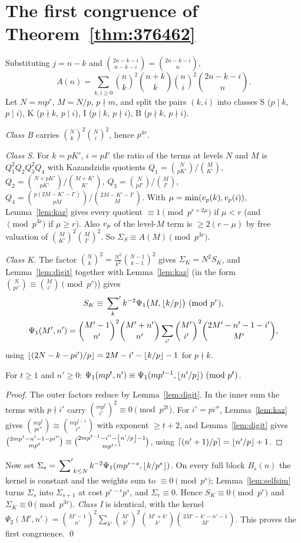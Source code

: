 \documentclass[11pt]{amsart}
\begin{document}
\section{The first congruence of Theorem~\ref{thm:376462}}\label{sec:first}

Substituting $j=n-k$ and $\binom{2n-k-i}{n-k-i}=\binom{2n-k-i}n$,
\[ A(n)=\sum_{k,i\ge0}\binom nk^2\binom{n+k}k\binom ni^2\binom{2n-k-i}{n}. \]
Let $N=mp^r$, $M=N/p$, $p\nmid m$, and split the pairs $(k,i)$ into classes S ($p\mid k$, $p\mid i$), K ($p\nmid k$, $p\mid i$), I ($p\mid k$, $p\nmid i$), B ($p\nmid k$, $p\nmid i$).

\emph{Class B} carries $\binom Nk^2\binom Ni^2$, hence $p^{4r}$.

\emph{Class S.} For $k=pK'$, $i=pI'$ the ratio of the terms at levels $N$ and $M$ is $Q_1^2Q_2Q_3^2Q_4$ with Kazandzidis quotients $Q_1=\binom N{pK'}/\binom M{K'}$, $Q_2=\binom{N+pK'}{pK'}/\binom{M+K'}{K'}$, $Q_3=\binom N{pI'}/\binom M{I'}$, $Q_4=\binom{p(2M-K'-I')}{pM}/\binom{2M-K'-I'}{M}$. With $\mu=\min(v_p(k),v_p(i))$, Lemma~\ref{lem:kaz} gives every quotient $\equiv1\pmod{p^{r+2\mu}}$ if $\mu<r$ (and $\pmod{p^{3r}}$ if $\mu\ge r$). Also $v_p$ of the level-$M$ term is $\ge2(r-\mu)$ by free valuation of $\binom M{K'}^2\binom M{I'}^2$. So $\Sigma_S\equiv A(M)\pmod{p^{3r}}$.

\emph{Class K.} The factor $\binom Nk^2=\frac{N^2}{k^2}\binom{N-1}{k-1}^2$ gives $\Sigma_K=N^2S_K$, and Lemma~\ref{lem:digit} together with Lemma~\ref{lem:kaz} (in the form $\binom{N}{pi'}\equiv\binom M{i'}\pmod{p^r}$) gives
\begin{gather*} S_K\equiv\sideset{}{'}\sum_kk^{-2}\Psi_1\bigl(M,\left\lfloor k/p\right\rfloor\bigr)\ (\mathrm{mod}\ p^r),\\ \Psi_1(M',n')=\binom{M'-1}{n'}^2\binom{M'+n'}{n'}\sum_{i'}\binom{M'}{i'}^2\binom{2M'-n'-1-i'}{M'}, \end{gather*}
using $\left\lfloor (2N-k-pi')/p\right\rfloor=2M-i'-\left\lfloor k/p\right\rfloor-1$ for $p\nmid k$.

\begin{lemma}\label{lem:selfsim}
For $t\ge1$ and $n'\ge0$: $\Psi_1(mp^t,n')\equiv\Psi_1(mp^{t-1},\left\lfloor n'/p\right\rfloor)\ (\mathrm{mod}\ p^t)$.
\end{lemma}
\begin{proof}
The outer factors reduce by Lemma~\ref{lem:digit}. In the inner sum the terms with $p\nmid i'$ carry $\binom{mp^t}{i'}^2\equiv0\pmod{p^{2t}}$. For $i'=pi''$, Lemma~\ref{lem:kaz} gives $\binom{mp^t}{pi''}\equiv\binom{mp^{t-1}}{i''}$ with exponent $\ge t+2$, and Lemma~\ref{lem:digit} gives $\binom{2mp^t-n'-1-pi''}{mp^t}\equiv\binom{2mp^{t-1}-i''-\left\lfloor n'/p\right\rfloor-1}{mp^{t-1}}$, using $\lceil(n'+1)/p\rceil=\left\lfloor n'/p\right\rfloor+1$.
\end{proof}
Now set $\Sigma_s=\sideset{}{'}\sum_{k\le N}k^{-2}\Psi_1(mp^{r-s},\left\lfloor k/p^s\right\rfloor)$. On every full block $B_s(n)$ the kernel is constant and the weights sum to $\equiv0\pmod{p^s}$; Lemma~\ref{lem:selfsim} turns $\Sigma_s$ into $\Sigma_{s+1}$ at cost $p^{r-s}p^s$, and $\Sigma_r\equiv0$. Hence $S_K\equiv0\pmod{p^r}$ and $\Sigma_K\equiv0\pmod{p^{3r}}$. \emph{Class I} is identical, with the kernel $\Psi_2(M',n')=\binom{M'-1}{n'}^2\sum_{k'}\binom{M'}{k'}^2\binom{M'+k'}{k'}\binom{2M'-k'-n'-1}{M'}$. This proves the first congruence. \qed
\end{document}
